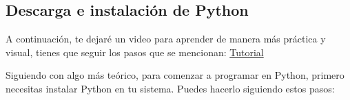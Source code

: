 \subsection{Descarga e instalación de Python}
A continuación, te dejaré un video para aprender de manera más práctica y visual, tienes que seguir los pasos que se mencionan: \href{https://www.youtube.com/watch?v=cmItObuFBuA}{Tutorial}

\begin{figure}[h]
    \centering
  \end{figure}

Siguiendo con algo más teórico, para comenzar a programar en Python, primero necesitas instalar Python en tu sistema. Puedes hacerlo siguiendo estos pasos:

